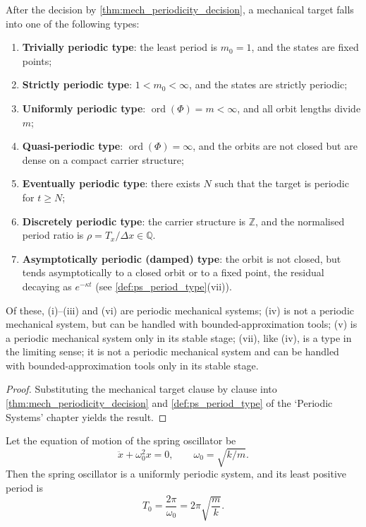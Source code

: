 \begin{corollary}\label{cor:mech_period_type}
After the decision by \cref{thm:mech_periodicity_decision}, a mechanical target falls into one of the following types:
\begin{enumerate}[label=(\roman*)]
    \item \textbf{Trivially periodic type}: the least period is $m_0=1$, and the states are fixed points;
    \item \textbf{Strictly periodic type}: $1<m_0<\infty$, and the states are strictly periodic;
    \item \textbf{Uniformly periodic type}: $\operatorname{ord}(\Phi)=m<\infty$, and all orbit lengths divide $m$;
    \item \textbf{Quasi-periodic type}: $\operatorname{ord}(\Phi)=\infty$, and the orbits are not closed but are dense on a compact carrier structure;
    \item \textbf{Eventually periodic type}: there exists $N$ such that the target is periodic for $t\ge N$;
    \item \textbf{Discretely periodic type}: the carrier structure is $\mathbb Z$, and the normalised period ratio is $\rho=T_x/\Delta x\in\mathbb Q$.
    \item \textbf{Asymptotically periodic (damped) type}: the orbit is not closed, but tends asymptotically to a closed orbit or to a fixed point, the residual decaying as $e^{-\kappa t}$ (see \cref{def:ps_period_type}(vii)).
\end{enumerate}
Of these, (i)--(iii) and (vi) are periodic mechanical systems; (iv) is not a periodic mechanical system, but can be handled with bounded-approximation tools; (v) is a periodic mechanical system only in its stable stage; (vii), like (iv), is a type in the limiting sense; it is not a periodic mechanical system and can be handled with bounded-approximation tools only in its stable stage.
\end{corollary}

\begin{proof}
Substituting the mechanical target clause by clause into \cref{thm:mech_periodicity_decision} and \cref{def:ps_period_type} of the `Periodic Systems' chapter yields the result.
\end{proof}

\begin{lemma}\label{lem:spring_periodic}
Let the equation of motion of the spring oscillator be
\[
\ddot x+\omega_0^2x=0,\qquad \omega_0=\sqrt{k/m}.
\]
Then the spring oscillator is a uniformly periodic system, and its least positive period is
\[
T_0=\frac{2\pi}{\omega_0}=2\pi\sqrt{\frac{m}{k}}.
\]
\end{lemma}

